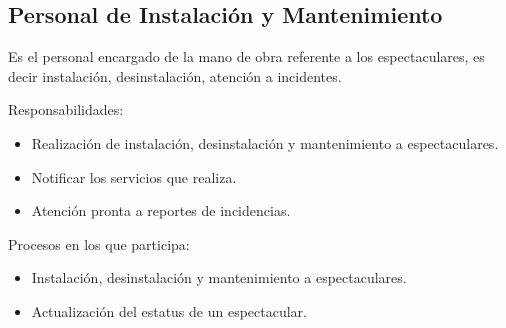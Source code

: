 
\begin{Usuario}{\subsection{Personal de Instalación y Mantenimiento}}{
    Es el personal encargado de la mano de obra referente a los espectaculares, es decir instalación, desinstalación, atención a incidentes.\\
}
    \item[Responsabilidades:] \cdtEmpty
    \begin{itemize}
        \item Realización de instalación, desinstalación y mantenimiento a espectaculares.
		\item Notificar los servicios que realiza.
		\item Atención pronta a reportes de incidencias.
    \end{itemize}

	\item[Procesos en los que participa:] \cdtEmpty
    \begin{itemize}
		\item Instalación, desinstalación y mantenimiento a espectaculares.
		\item Actualización del estatus de un espectacular.
    \end{itemize}
\end{Usuario}

